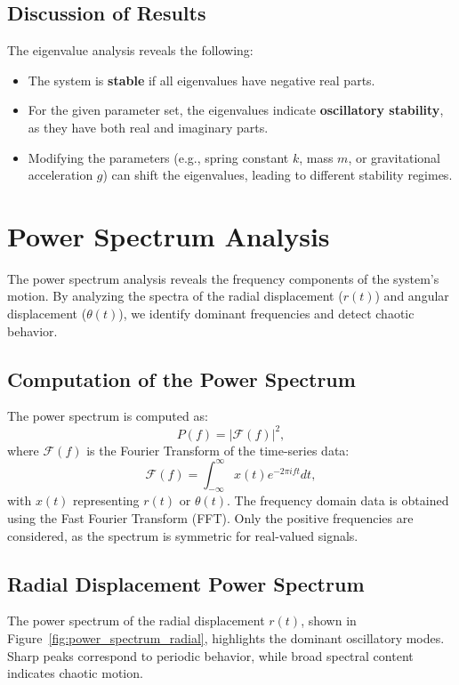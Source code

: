 \documentclass[12pt]{article}
\begin{document}
\subsection{Discussion of Results}
The eigenvalue analysis reveals the following:
\begin{itemize}
    \item The system is \textbf{stable} if all eigenvalues have negative real parts.
    \item For the given parameter set, the eigenvalues indicate \textbf{oscillatory stability}, as they have both real and imaginary parts.
    \item Modifying the parameters (e.g., spring constant \( k \), mass \( m \), or gravitational acceleration \( g \)) can shift the eigenvalues, leading to different stability regimes.
\end{itemize}

\section{Power Spectrum Analysis}

The power spectrum analysis reveals the frequency components of the system's motion. By analyzing the spectra of the radial displacement (\( r(t) \)) and angular displacement (\( \theta(t) \)), we identify dominant frequencies and detect chaotic behavior.

\subsection{Computation of the Power Spectrum}
The power spectrum is computed as:
\[
P(f) = |\mathcal{F}(f)|^2,
\]
where \( \mathcal{F}(f) \) is the Fourier Transform of the time-series data:
\[
\mathcal{F}(f) = \int_{-\infty}^{\infty} x(t) e^{-2\pi i f t} dt,
\]
with \( x(t) \) representing \( r(t) \) or \( \theta(t) \). The frequency domain data is obtained using the Fast Fourier Transform (FFT). Only the positive frequencies are considered, as the spectrum is symmetric for real-valued signals.

\subsection{Radial Displacement Power Spectrum}
The power spectrum of the radial displacement \( r(t) \), shown in Figure~\ref{fig:power_spectrum_radial}, highlights the dominant oscillatory modes. Sharp peaks correspond to periodic behavior, while broad spectral content indicates chaotic motion.
\end{document}
